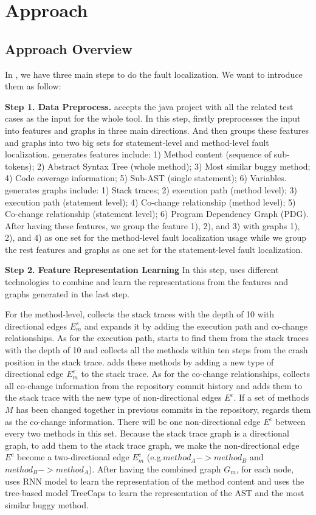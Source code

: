 \section{Approach}
\subsection{Approach Overview}

In \tool, we have three main steps to do the fault localization. We want to introduce them as follow:

{\bf Step 1. Data Preprocess.} \tool accepts the java project with all the related test cases as the input for the whole tool. In this step, \tool firstly preprocesses the input into features and graphs in three main directions. And then \tool groups these features and graphs into two big sets for statement-level and method-level fault localization. \tool generates features include: 1) Method content (sequence of sub-tokens); 2) Abstract Syntax Tree (whole method); 3) Most similar buggy method; 4) Code coverage information; 5) Sub-AST (single statement); 6) Variables. \tool generates graphs include: 1) Stack traces; 2) execution path (method level); 3) execution path (statement level); 4) Co-change relationship (method level); 5) Co-change relationship (statement level); 6) Program Dependency Graph (PDG). After having these features, we group the feature 1), 2), and 3) with graphs 1), 2), and 4) as one set for the method-level fault localization usage while we group the rest features and graphs as one set for the statement-level fault localization.

{\bf Step 2. Feature Representation Learning} In this step, \tool uses different technologies to combine and learn the representations from the features and graphs generated in the last step. 

For the method-level, \tool collects the stack traces with the depth of 10 with directional edges $E_m^s$ and expands it by adding the execution path and co-change relationships. As for the execution path, \tool starts to find them from the stack traces with the depth of 10 and collects all the methods within ten steps from the crash position in the stack trace. \tool adds these methods by adding a new type of directional edge $E_m^e$ to the stack trace. As for the co-change relationships, \tool collects all co-change information from the repository commit history and adds them to the stack trace with the new type of non-directional edges $E^c$. If a set of methods $M$ has been changed together in previous commits in the repository, \tool regards them as the co-change information. There will be one non-directional edge $E^c$ between every two methods in this set. Because the stack trace graph is a directional graph, to add them to the stack trace graph, we make the non-directional edge $E^c$ become a two-directional edge $E_m^c$ (e.g.$method_A -> method_B$ and $method_B -> method_A$). After having the combined graph $G_m$, for each node, \tool uses RNN model \cite{} to learn the representation of the method content and uses the tree-based model TreeCaps \cite{} to learn the representation of the AST and the most similar buggy method. 


